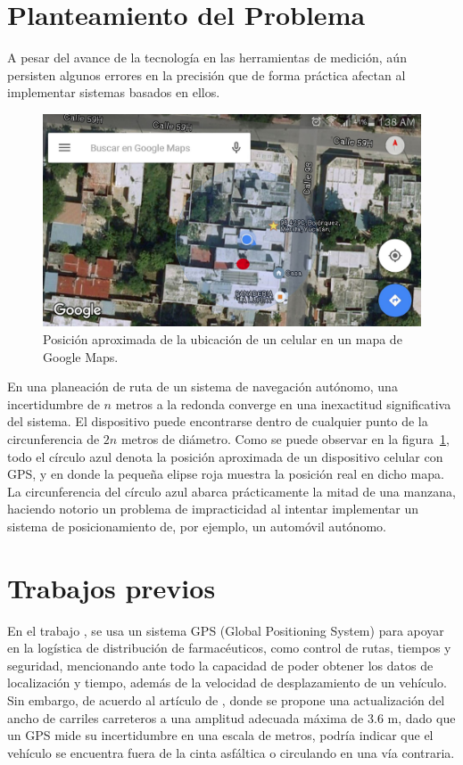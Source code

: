 \section{Planteamiento del Problema}
A pesar del avance de la tecnología en las herramientas de medición, aún persisten algunos errores en la precisión que de forma práctica afectan al implementar sistemas basados en ellos. \\

\begin{figure}[H]
\centering
\includegraphics[scale=0.2]{Figures/Pred}
\caption[Posición de celular en mapa.]{Posición aproximada de la ubicación de un celular en un mapa de Google Maps.}
\label{fig:Prec}
\end{figure}

En una planeación de ruta de un sistema de navegación autónomo, una incertidumbre de $n$ metros a la redonda converge en una inexactitud significativa del sistema. El dispositivo puede encontrarse dentro de cualquier punto de la circunferencia de $2n$ metros de diámetro. Como se puede observar en la figura~\ref{fig:Prec}, todo el círculo azul denota la posición aproximada de un dispositivo celular con GPS, y en donde la pequeña elipse roja muestra la posición real en dicho mapa. La circunferencia del círculo azul abarca prácticamente la mitad de una manzana, haciendo notorio un problema de impracticidad al intentar implementar un sistema de posicionamiento de, por ejemplo, un automóvil autónomo.

\section{Trabajos previos}
En el trabajo \cite{de2011diseno}, se usa un sistema GPS (Global Positioning System\footnotemark) para apoyar en la logística de distribución de farmacéuticos, como control de rutas, tiempos y seguridad, mencionando ante todo la capacidad de poder obtener los datos de localización y tiempo, además de la velocidad de desplazamiento de un vehículo. Sin embargo, de acuerdo al artículo de \cite{mendoza2004recomendaciones}, donde se propone una actualización del ancho de carriles carreteros a una amplitud adecuada máxima de 3.6 m, dado que un GPS mide su incertidumbre en una escala de metros, podría indicar que el vehículo se encuentra fuera de la cinta asfáltica o circulando en una vía contraria. \\

